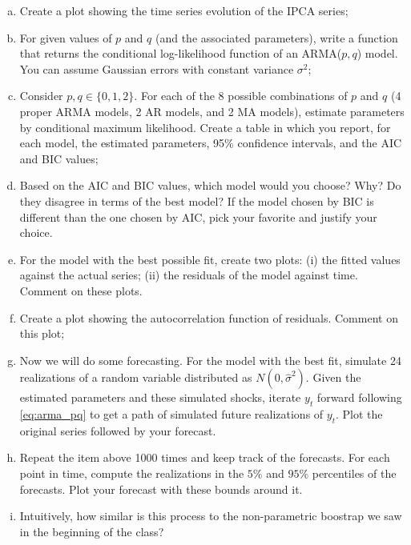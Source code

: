 \documentclass[11pt]{article}
\theoremstyle{definition}
\begin{document}
\begin{enumerate}[a)]
	\item Create a plot showing the time series evolution of the IPCA series;
	\item For given values of $p$ and $q$ (and the associated parameters), write a function that returns the conditional log-likelihood function of an ARMA($p,q$) model. You can assume Gaussian errors with constant variance $\sigma^2$;
	\item Consider $p,q \in \{0,1,2\}$. For each of the 8 possible combinations of $p$ and $q$ (4 proper ARMA models, 2 AR models, and 2 MA models), estimate parameters by conditional maximum likelihood. Create a table in which you report, for each model, the estimated parameters, 95\% confidence intervals, and the AIC and BIC values;
	\item Based on the AIC and BIC values, which model would you choose? Why? Do they disagree in terms of the best model? If the model chosen by BIC is different than the one chosen by AIC, pick your favorite and justify your choice.
	\item For the model with the best possible fit, create two plots: (i) the fitted values against the actual series; (ii) the residuals of the model against time. Comment on these plots. 
	\item Create a plot showing the autocorrelation function of residuals. Comment on this plot;
	\item Now we will do some forecasting. For the model with the best fit, simulate 24 realizations of a random variable distributed as $N(0, \hat{\sigma}^2)$. Given the estimated parameters and these simulated shocks, iterate $y_t$ forward following \eqref{eq:arma_pq} to get a path of simulated future realizations of $y_t$. Plot the original series followed by your forecast.
	\item Repeat the item above 1000 times and keep track of the forecasts. For each point in time, compute the realizations in the $5\%$ and $95\%$ percentiles of the forecasts. Plot your forecast with these bounds around it.
	\item Intuitively, how similar is this process to the non-parametric boostrap we saw in the beginning of the class?
\end{enumerate}
\end{document}
